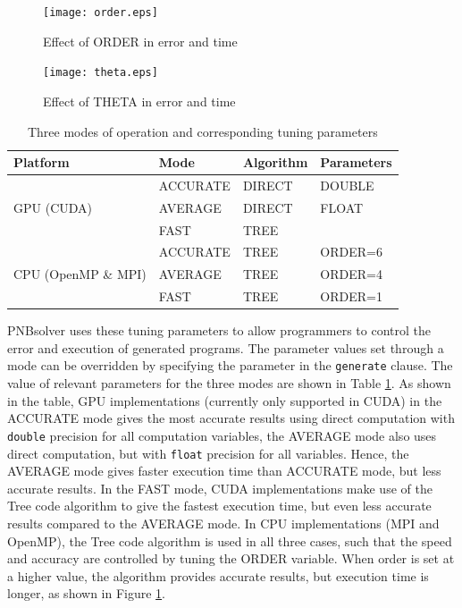 \documentclass[draftclsnofoot]{elsarticle}
\begin{document}
\begin{figure}[!t]
\centering
\texttt{[image: order.eps]}
\caption{Effect of ORDER in error and time}
\label{fig_order}
\end{figure}

\begin{figure}[!t]
\centering
\texttt{[image: theta.eps]}
\caption{Effect of THETA in error and time}
\label{fig_theta}
\end{figure}

 
\begin{table}[!t]
\caption{Three modes of operation and corresponding tuning parameters }
\label{tbl_pars}
\centering

\begin{tabular}{|l|l|l|l|} \hline
Platform & Mode & Algorithm &Parameters\\\hline
\multirow{3}{*}{GPU (CUDA)} & ACCURATE & DIRECT& DOUBLE \\
& AVERAGE & DIRECT & FLOAT \\
& FAST & TREE & \\ \hline
\multirow{3}{*}{CPU (OpenMP \& MPI)} & ACCURATE &TREE& ORDER=6 \\
& AVERAGE&TREE & ORDER=4 \\
& FAST &TREE& ORDER=1 \\\hline
\end{tabular}
\end{table}

PNBsolver uses these tuning parameters to allow programmers to control the error and execution of generated programs. The parameter values set through a mode can be 
overridden by specifying the parameter in the \texttt{generate} clause. The value of relevant parameters for the three modes are shown in Table \ref{tbl_pars}. 
As shown in the table, GPU implementations (currently only supported in CUDA) in the ACCURATE mode gives the most accurate results using direct computation with \texttt{double}  precision for all computation variables, the AVERAGE mode also uses direct computation, but with \texttt{float} precision for all variables. Hence, the AVERAGE mode gives faster execution time than ACCURATE mode, but less accurate results. In the FAST mode, CUDA implementations make use of the Tree code algorithm to give the fastest execution time, but even less accurate results compared to the AVERAGE mode. In CPU implementations (MPI and OpenMP), the Tree code algorithm is used in all three cases, such that the speed and accuracy are controlled by tuning the ORDER variable. When order is set at a higher value, the algorithm provides accurate results, but execution time is longer, as shown in Figure \ref{fig_order}.   
\end{document}
